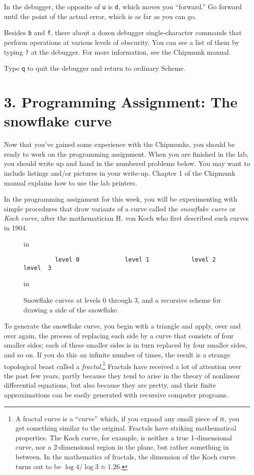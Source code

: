 In the debugger, the opposite of {\tt u} is {\tt d}, which moves you
``forward.'' Go forward until the point of the actual error,
which is as far as you can go.

Besides {\tt b} and {\tt f}, there about a dozen debugger
single-character commands that perform operations at various
levels of obscurity.  You can see a list of them by typing {\tt ?}
at the debugger.  For more information, see the Chipmunk manual.

Type {\tt q} to quit the debugger and return to ordinary Scheme.

\section{3. Programming Assignment: The snowflake curve}

Now that you've gained some experience with the Chipmunks, you should
be ready to work on the programming assignment.  When
you are finished in the lab, you should write up and hand in the
numbered problems below.  You may want to include listings and/or
pictures in your write-up.  Chapter 1 of the Chipmunk manual explains
how to use the lab printers.

In the programming assignment for this week, you will be experimenting
with simple procedures that draw variants of a curve called the {\em
snowflake curve} or {\em Koch curve}, after the mathematician H. von
Koch who first described such curves in 1904.

\begin{figure}
 in
{\small
\begin{verbatim}
         level 0             level 1            level 2             level  3
\end{verbatim}
}
 in
\caption{{\protect\footnotesize
Snowflake curves at levels 0 through 3, and a recursive scheme for
drawing a side of the snowflake.}}
\label{snowflake}
\end{figure}

To generate the snowflake curve, you begin with a triangle and apply,
over and over again, the process of replacing each side by a curve
that consists of four smaller sides; each of these smaller sides is in
turn replaced by four smaller sides, and so on.  If you do this an
infinite number of times, the result is a strange topological beast
called a {\em fractal}.\footnote{A fractal curve is a ``curve'' which,
if you expand any small piece of it, you get something similar to the
original.  Fractals have striking mathematical properties.  The Koch
curve, for example, is neither a true 1-dimensional curve, nor a
2-dimensional region in the plane, but rather something in between.
In the mathematics of fractals, the dimension of the Koch curve turns
out to be $\log{4}/\log{3} \approx 1.26$.} Fractals have received a
lot of attention over the past few years, partly because they tend
to arise in the theory of nonlinear differential equations, but also
because they are pretty, and their finite approximations can be easily
generated with recursive computer programs.

